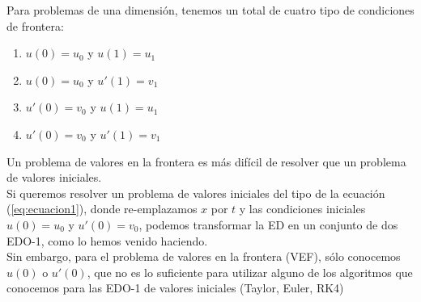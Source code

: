 \begin{frame}
Para problemas de una dimensión, tenemos un total de cuatro tipo de condiciones de frontera:
\begin{enumerate}
\item $u(0) = u_{0}$ y $u(1) = u_{1}$ 
\item $u(0) = u_{0}$ y $u'(1) = v_{1}$
\item $u'(0) = v_{0}$ y $u(1) = u_{1}$
\item $u'(0) = v_{0}$ y $u'(1) = v_{1}$   
\end{enumerate}
\end{frame}
\begin{frame}
Un problema de valores en la frontera es más difícil de resolver que un problema de valores iniciales.
\\
\medskip
Si queremos resolver un problema de valores iniciales del tipo de la ecuación (\ref{eq:ecuacion1}), donde re-emplazamos $x$ por $t$ y las condiciones iniciales $u(0) = u_{0}$ y $u'(0) = v_{0}$, podemos transformar la ED en un conjunto de dos EDO-1, como lo hemos venido haciendo.
\\
\medskip
Sin embargo, para el problema de valores en la frontera (VEF), sólo conocemos $u(0)$ o $u'(0)$, que no es lo suficiente para utilizar alguno de los algoritmos que conocemos para las EDO-1 de valores iniciales (Taylor, Euler, RK4)
\end{frame}
